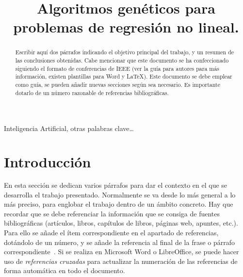 \documentclass[conference,a4paper]{IEEEtran}
\begin{document}
\title{Algoritmos genéticos para problemas de regresión no lineal.}

\author{
  
  \and
  
}

\maketitle


\begin{abstract}
  Escribir aquí dos párrafos indicando el objetivo principal del trabajo, y un
  resumen de las conclusiones obtenidas. Cabe mencionar que este documento se
  ha confeccionado siguiendo el formato de conferencias de IEEE (ver la guía
  para autores para más información, existen plantillas para Word y \LaTeX).
  Este documento se debe emplear como guía, se pueden añadir nuevas secciones
  según sea necesario. Es importante dotarlo de un número razonable de
  referencias bibliográficas.
\end{abstract}


\begin{IEEEkeywords}
  Inteligencia Artificial, otras palabras clave…
\end{IEEEkeywords}


\section{Introducción}

En esta sección se dedican varios párrafos para dar el contexto en el que se
desarrolla el trabajo presentado. Normalmente se va desde lo más general a lo
más preciso, para englobar el trabajo dentro de un ámbito concreto. Hay que
recordar que se debe referenciar la información que se consiga de fuentes
bibliográficas (artículos, libros, capítulos de libros, páginas web, apuntes,
etc.). Para ello se añade el ítem correspondiente en el apartado de
referencias, dotándolo de un número, y se añade la referencia al final de la
frase o párrafo correspondiente~\cite{b1}. Si se realiza en Microsoft Word o
LibreOffice, se puede hacer uso de \emph{referencias cruzadas} para actualizar
la numeración de las referencias de forma automática en todo el documento.
\end{document}

